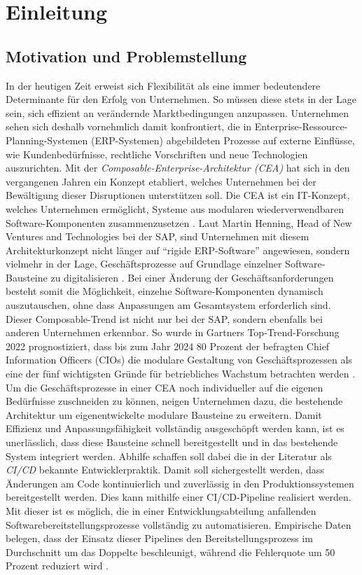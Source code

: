 \section{Einleitung}

\subsection{Motivation und Problemstellung}
In der heutigen Zeit erweist sich Flexibilität als eine immer bedeutendere Determinante für den Erfolg von Unternehmen. So müssen diese stets in der Lage sein, sich effizient an verändernde Marktbedingungen anzupassen. Unternehmen sehen sich deshalb vornehmlich damit konfrontiert, die in Enterprise-Ressource-Planning-Systemen (\acs{ERP}-Systemen) abgebildeten Prozesse auf externe Einflüsse, wie Kundenbedürfnisse, rechtliche Vorschriften und neue Technologien auszurichten. Mit der \textit{Composable-Enterprise-Architektur (CEA)} hat sich in den vergangenen Jahren ein Konzept etabliert, welches Unternehmen bei der Bewältigung dieser Disruptionen unterstützen soll. Die CEA ist ein IT-Konzept, welches Unternehmen ermöglicht, Systeme aus modularen wiederverwendbaren Software-Kompo\-nenten zusammenzusetzen \cite{.20230313}. Laut Martin Henning, Head of New Ventures and Technologies bei der SAP, sind Unternehmen mit diesem Architekturkonzept nicht länger auf \enquote{rigide ERP-Software} angewiesen, sondern vielmehr in der Lage, Geschäftsprozesse auf Grundlage einzelner Software-Bausteine zu digitalisieren \cite{Galer.20221019}. Bei einer Änderung der Geschäftsanforderungen besteht somit die Möglichkeit, einzelne Software-Kompo\-nenten dynamisch auszutauschen, ohne dass Anpassungen am Gesamtsystem erforderlich sind. Dieser Composable-Trend ist nicht nur bei der SAP, sondern ebenfalls bei anderen Unternehmen erkennbar. So wurde in Gartners Top-Trend-Forschung 2022 prognostiziert, dass bis zum Jahr 2024 80 Prozent der befragten Chief Information Officers (\acs{CIO}s) die modulare Gestaltung von Geschäftsprozessen als eine der fünf wichtigsten Gründe für betriebliches Wachstum betrachten werden \cite{Gartner.20230408}. Um die Geschäftsprozesse in einer CEA noch individueller auf die eigenen Bedürfnisse zuschneiden zu können, neigen Unternehmen dazu, die bestehende Architektur um eigenentwickelte modulare Bausteine zu erweitern. Damit Effizienz und Anpassungs\-fähigkeit vollständig ausgeschöpft werden kann, ist es unerlässlich, dass diese Bausteine schnell bereitgestellt und in das bestehende System integriert werden. Abhilfe schaffen soll dabei die in der Literatur als \textit{\ac{CI/CD}} bekannte Entwicklerpraktik. Damit soll sichergestellt werden, dass Änderungen am Code kontinuierlich und zuverlässig in den Produktionssystemen bereitgestellt werden. Dies kann mithilfe einer CI/CD-Pipeline realisiert werden. Mit dieser ist es möglich, die in einer Entwicklungsabteilung anfallenden Softwarebereitstellungsprozesse vollständig zu automatisieren. Empirische Daten belegen, dass der Einsatz dieser Pipelines den Bereitstellungsprozess im Durchschnitt um das Doppelte beschleunigt, während die Fehlerquote um 50 Prozent reduziert wird \cite{abdalslam.20230128}.\\ 
